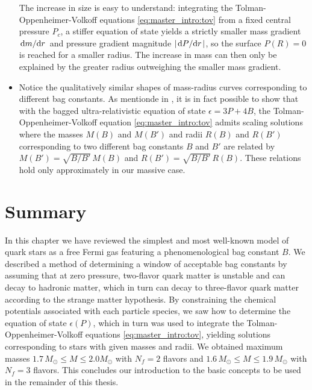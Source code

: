 \begin{itemize}
      The increase in size is easy to understand:
      integrating the Tolman-Oppenheimer-Volkoff equations \eqref{eq:master_intro:tov} from a fixed central pressure $P_c$,
      a stiffer equation of state yields a strictly smaller mass gradient $\odv{m}/{r}$ and pressure gradient magnitude $\abs{\odv{P}/{r}}$,
      so the surface $P(R)=0$ is reached for a smaller radius.
      The increase in mass can then only be explained by the greater radius outweighing the smaller mass gradient.
\item Notice the qualitatively similar shapes of mass-radius curves corresponding to different bag constants.
      As mentionde in \cite[equation 8.29]{ref:glendenning},
      it is in fact possible to show that with the bagged ultra-relativistic equation of state $\epsilon = 3P + 4B$,
      the Tolman-Oppenheimer-Volkoff equation \eqref{eq:master_intro:tov} admits scaling solutions
      where the masses $M(B)$ and $M(B')$ and radii $R(B)$ and $R(B')$ corresponding to two different bag constants $B$ and $B'$
      are related by $M(B') = \sqrt{B/B'} \, M(B)$ and $R(B') = \sqrt{B/B'} \, R(B)$.
      These relations hold only approximately in our massive case.
\end{itemize}

\section{Summary}

In this chapter we have reviewed the simplest and most well-known model of quark stars
as a free Fermi gas featuring a phenomenological bag constant $B$.
We described a method of determining a window of acceptable bag constants by assuming that at zero pressure,
two-flavor quark matter is unstable and can decay to hadronic matter,
which in turn can decay to three-flavor quark matter according to the strange matter hypothesis.
By constraining the chemical potentials associated with each particle species,
we saw how to determine the equation of state $\epsilon(P)$,
which in turn was used to integrate the Tolman-Oppenheimer-Volkoff equations \eqref{eq:master_intro:tov},
yielding solutions corresponding to stars with given masses and radii.
We obtained maximum masses $1.7 \, M_\odot \leq M \leq 2.0 M_\odot$ with $N_f=2$ flavors
and $1.6 \, M_\odot \leq M \leq 1.9 \, M_\odot$ with $N_f=3$ flavors.
This concludes our introduction to the basic concepts to be used in the remainder of this thesis.
